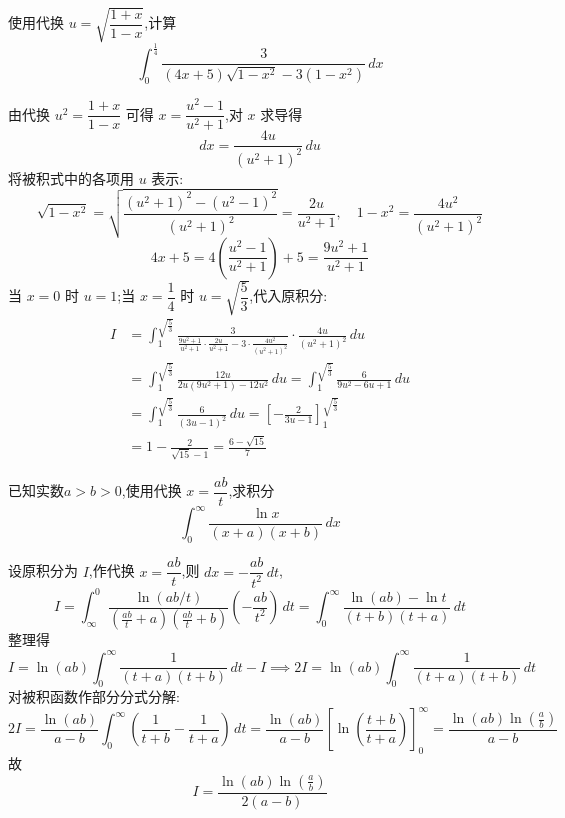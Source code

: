 \begin{questions}
    \question 使用代换 $u=\sqrt{\dfrac{1+x}{1-x}}$,计算
    \[
    \int_{0}^{\frac{1}{4}} \frac{3}{(4x+5)\sqrt{1-x^2}-3(1-x^2)}\,dx
    \]
    \begin{solution}
        由代换 $u^2 = \dfrac{1+x}{1-x}$ 可得 $x = \dfrac{u^2-1}{u^2+1}$,对 $x$ 求导得
        \[
        dx = \frac{4u}{(u^2+1)^2}\,du
        \]
        将被积式中的各项用 $u$ 表示:
        \[
        \sqrt{1-x^2} = \sqrt{\frac{(u^2+1)^2-(u^2-1)^2}{(u^2+1)^2}} = \frac{2u}{u^2+1},\quad 1-x^2 = \frac{4u^2}{(u^2+1)^2}
        \]
        \[
        4x+5 = 4\left(\frac{u^2-1}{u^2+1}\right)+5 = \frac{9u^2+1}{u^2+1}
        \]
        当 $x=0$ 时 $u=1$;当 $x=\dfrac{1}{4}$ 时 $u=\sqrt{\dfrac{5}{3}}$,代入原积分:
        \begin{align*}
        I &= \int_{1}^{\sqrt{\frac{5}{3}}} \frac{3}{\frac{9u^2+1}{u^2+1} \cdot \frac{2u}{u^2+1} - 3 \cdot \frac{4u^2}{(u^2+1)^2}} \cdot \frac{4u}{(u^2+1)^2}\,du \\
        &= \int_{1}^{\sqrt{\frac{5}{3}}} \frac{12u}{2u(9u^2+1)-12u^2}\,du = \int_{1}^{\sqrt{\frac{5}{3}}} \frac{6}{9u^2-6u+1}\,du \\
        &= \int_{1}^{\sqrt{\frac{5}{3}}} \frac{6}{(3u-1)^2}\,du = \left[ -\frac{2}{3u-1} \right]_{1}^{\sqrt{\frac{5}{3}}} \\
        &= 1 - \frac{2}{\sqrt{15}-1} = \frac{6-\sqrt{15}}{7}
        \end{align*}
    \end{solution}

    \question 已知实数$a>b>0$,使用代换 $x=\dfrac{ab}{t}$,求积分
    \[
    \int_{0}^{\infty} \frac{\ln x}{(x+a)(x+b)}\,dx
    \]
    \begin{solution}
        设原积分为 $I$,作代换 $x = \dfrac{ab}{t}$,则 $dx = -\dfrac{ab}{t^2}\,dt$,
        \[
        I = \int_{\infty}^{0} \frac{\ln(ab/t)}{(\frac{ab}{t}+a)(\frac{ab}{t}+b)} \left( -\frac{ab}{t^2} \right) \,dt = \int_{0}^{\infty} \frac{\ln(ab)-\ln t}{(t+b)(t+a)}\,dt
        \]
        整理得
        \[
        I = \ln(ab) \int_{0}^{\infty} \frac{1}{(t+a)(t+b)}\,dt - I \implies 2I = \ln(ab) \int_{0}^{\infty} \frac{1}{(t+a)(t+b)}\,dt
        \]
        对被积函数作部分分式分解:
        \[
        2I = \frac{\ln(ab)}{a-b} \int_{0}^{\infty} \left( \frac{1}{t+b} - \frac{1}{t+a} \right) \,dt 
        = \frac{\ln(ab)}{a-b} \left[ \ln\left( \frac{t+b}{t+a} \right) \right]_{0}^{\infty} = \frac{\ln(ab)\ln\left(\frac{a}{b}\right)}{a-b}
        \]
        故
        \[
        I = \frac{\ln(ab)\ln\left(\frac{a}{b}\right)}{2(a-b)}
        \]
    \end{solution}


\end{questions}
